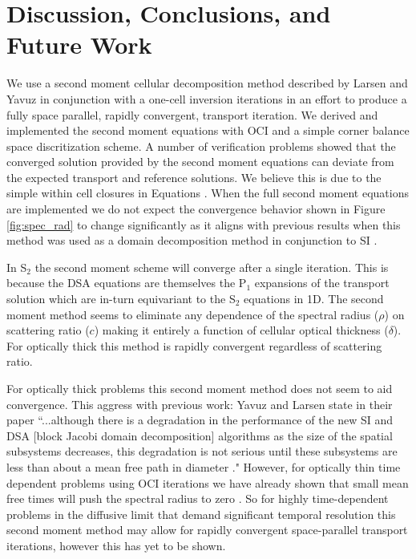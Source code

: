 \section{Discussion, Conclusions, and Future Work}

We use a second moment cellular decomposition method described by Larsen and Yavuz \cite{yavuz_spatial_1989} in conjunction with a one-cell inversion iterations \cite{rosa_cellwise_2013, morgan_2025_oci} in an effort to produce a fully space parallel, rapidly convergent, transport iteration.
We derived and implemented the second moment equations with OCI and a simple corner balance space discritization scheme.
A number of verification problems showed that the converged solution provided by the second moment equations can deviate from the expected transport and reference solutions.
We believe this is due to the simple within cell closures in Equations \label{eq:simple_close}.
When the full second moment equations are implemented we do not expect the convergence behavior shown in Figure \ref{fig:spec_rad} to change significantly as it aligns with previous results when this method was used as a domain decomposition method in conjunction to SI \cite{yavuz_spatial_1989}.

In S$_2$ the second moment scheme will converge after a single iteration.
This is because the DSA equations are themselves the P$_1$ expansions of the transport solution which are in-turn equivariant to the S$_2$ equations in 1D.
The second moment method seems to eliminate any dependence of the spectral radius ($\rho$) on scattering ratio ($c$) making it entirely a function of cellular optical thickness ($\delta$).
For optically thick this method is rapidly convergent regardless of scattering ratio.

For optically thick problems this second moment method does not seem to aid convergence.
This aggress with previous work: Yavuz and Larsen state in their paper ``...although there is a degradation in the performance of the new SI and DSA [block Jacobi domain decomposition] algorithms as the size of the spatial subsystems decreases, this degradation is not serious until these subsystems are less than about a mean free path in diameter \cite{yavuz_spatial_1989}." 
However, for optically thin time dependent problems using OCI iterations we have already shown that small mean free times will push the spectral radius to zero \cite{morgan_2025_oci}.
So for highly time-dependent problems in the diffusive limit that demand significant temporal resolution this second moment method may allow for rapidly convergent space-parallel transport iterations, however this has yet to be shown.

